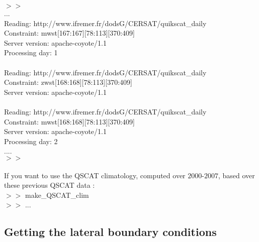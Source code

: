 \noindent $>>$ \\ 
...\\ 
Reading: http://www.ifremer.fr/dodsG/CERSAT/quikscat\_daily\\
  Constraint: mwst[167:167][78:113][370:409]\\
Server version: apache-coyote/1.1\\
    Processing day: 1\\
\\
Reading: http://www.ifremer.fr/dodsG/CERSAT/quikscat\_daily\\
  Constraint: zwst[168:168][78:113][370:409]\\
Server version: apache-coyote/1.1\\
\\
Reading: http://www.ifremer.fr/dodsG/CERSAT/quikscat\_daily\\
  Constraint: mwst[168:168][78:113][370:409]\\
Server version: apache-coyote/1.1\\
    Processing day: 2\\
....\\
$>>$\\ 
\\

If you want to use the QSCAT climatology, computed over $2000$-$2007$, based over
these previous QSCAT data :\\

\noindent $>>$ make\_QSCAT\_clim \\
$>>$ ...\\

\subsection{Getting the lateral boundary conditions}

